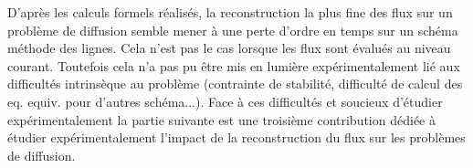 D'après les calculs formels réalisés, la reconstruction la plus fine des flux sur un problème de diffusion semble mener à une perte d'ordre en temps sur un schéma méthode des lignes.
Cela n'est pas le cas lorsque les flux sont évalués au niveau courant.
Toutefois cela n'a pas pu être mis en lumière expérimentalement lié aux difficultés intrinsèque au problème (contrainte de stabilité, difficulté de calcul des eq. equiv. pour d'autres schéma...).
Face à ces difficultés et soucieux d'étudier expérimentalement la partie suivante est une troisième contribution dédiée à étudier expérimentalement l'impact 
de la reconstruction du flux sur les problèmes de diffusion.